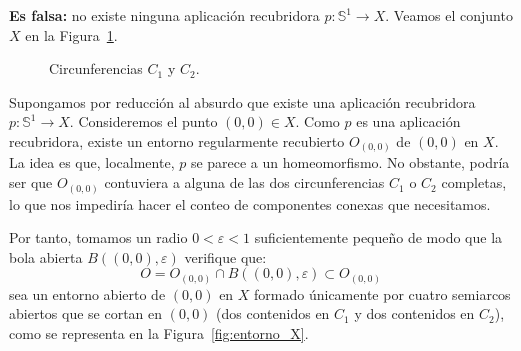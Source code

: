 \documentclass[12pt]{article}
\begin{document}
\begin{ejercicio}
\begin{enumerate}[label=\alph*)]
                \textbf{Es falsa:} no existe ninguna aplicación recubridora $p:\mathbb{S}^1\to X$. Veamos el conjunto $X$ en la Figura~\ref{fig:circulos_b}.
                \begin{figure}[h]
                    \centering
                    \caption{Circunferencias $C_1$ y $C_2$.}
                    \label{fig:circulos_b}
                \end{figure}

                Supongamos por reducción al absurdo que existe una aplicación recubridora $p:\mathbb{S}^1\to X$. Consideremos el punto $(0,0)\in X$. Como $p$ es una aplicación recubridora, existe un entorno regularmente recubierto $O_{(0,0)}$ de $(0,0)$ en $X$. La idea es que, localmente, $p$ se parece a un homeomorfismo. No obstante, podría ser que $O_{(0,0)}$ contuviera a alguna de las dos circunferencias $C_1$ o $C_2$ completas, lo que nos impediría hacer el conteo de componentes conexas que necesitamos.

                Por tanto, tomamos un radio $0 < \varepsilon < 1$ suficientemente pequeño de modo que la bola abierta $B((0,0),\varepsilon)$ verifique que:
                \begin{equation*}
                    O = O_{(0,0)} \cap B((0,0),\varepsilon) \subset O_{(0,0)}
                \end{equation*}
                sea un entorno abierto de $(0,0)$ en $X$ formado únicamente por cuatro semiarcos abiertos que se cortan en $(0,0)$ (dos contenidos en $C_1$ y dos contenidos en $C_2$), como se representa en la Figura~\ref{fig:entorno_X}.
                \begin{figure}[h]
                    \centering
\end{figure}
\end{enumerate}
\end{ejercicio}
\end{document}
